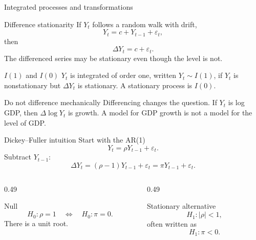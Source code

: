 \documentclass[10pt]{beamer}
\newcommand{\eps}{\varepsilon}
\begin{document}
\begin{frame}{Integrated processes and transformations}
\small
\begin{block}{Difference stationarity}
If $Y_t$ follows a random walk with drift,
\[
Y_t=c+Y_{t-1}+\eps_t,
\]
then
\[
\Delta Y_t=c+\eps_t.
\]
The differenced series may be stationary even though the level is not.
\end{block}

\pause
\begin{block}{$I(1)$ and $I(0)$}
$Y_t$ is integrated of order one, written $Y_t\sim I(1)$, if $Y_t$ is nonstationary but $\Delta Y_t$ is stationary. A stationary process is $I(0)$.
\end{block}

\pause
\begin{alertblock}{Do not difference mechanically}
Differencing changes the question. If $Y_t$ is log GDP, then $\Delta\log Y_t$ is growth. A model for GDP growth is not a model for the level of GDP.
\end{alertblock}
\end{frame}

\begin{frame}{Dickey--Fuller intuition}
\label{slide:adf}
\small
Start with the AR(1)
\[
Y_t=\rho Y_{t-1}+\eps_t.
\]
Subtract $Y_{t-1}$:
\[
\Delta Y_t=(\rho-1)Y_{t-1}+\eps_t=\pi Y_{t-1}+\eps_t.
\]

\begin{columns}[T]
\begin{column}{0.49\textwidth}
\begin{block}{Null}
\[
H_0:\rho=1
\quad\Longleftrightarrow\quad
H_0:\pi=0.
\]
There is a unit root.
\end{block}
\end{column}
\begin{column}{0.49\textwidth}
\begin{block}{Stationary alternative}
\[
H_1:|\rho|<1,
\]
often written as
\[
H_1:\pi<0.
\]
\end{block}
\end{column}
\end{columns}

\hfill\hyperlink{app:adf-details}{}
\end{frame}
\end{document}
